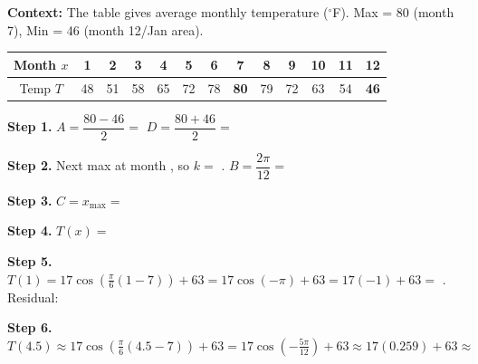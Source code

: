 \documentclass[10pt]{article}
\begin{document}
\begin{tcolorbox}[colback=white, colframe=black!40,
    title=\textbf{Tier R --- Reinforce (Key)},
    fonttitle=\bfseries, arc=2mm, left=3mm, right=3mm, top=2mm, bottom=2mm]

\textbf{Context:} The table gives average monthly temperature (${}^\circ$F).
Max = 80 (month 7), Min = 46 (month 12/Jan area).

\vspace{4pt}
\begin{center}
\renewcommand{\arraystretch}{1.35}
\small
\begin{tabular}{|c|c|c|c|c|c|c|c|c|c|c|c|c|}
\hline
Month $x$ & 1 & 2 & 3 & 4 & 5 & 6 & 7 & 8 & 9 & 10 & 11 & 12 \\
\hline
Temp $T$ & 48 & 51 & 58 & 65 & 72 & 78 & \textbf{80} & 79 & 72 & 63 & 54 & \textbf{46} \\
\hline
\end{tabular}
\end{center}

\vspace{4pt}
\textbf{Step 1.} $A = \dfrac{80-46}{2} = $  \qquad $D = \dfrac{80+46}{2} = $ 

\vspace{4pt}
\textbf{Step 2.} Next max at month , so $k = $ . $B = \dfrac{2\pi}{12} = $ 

\vspace{4pt}
\textbf{Step 3.} $C = x_{\max} = $ 

\vspace{4pt}
\textbf{Step 4.} $T(x) = $ 

\vspace{4pt}
\textbf{Step 5.} $T(1) = 17\cos\!\left(\tfrac{\pi}{6}(1-7)\right)+63 = 17\cos(-\pi)+63 = 17(-1)+63 = $ . Residual: 

\vspace{4pt}
\textbf{Step 6.} $T(4.5) \approx 17\cos\!\left(\tfrac{\pi}{6}(4.5-7)\right)+63 = 17\cos\!\left(-\tfrac{5\pi}{12}\right)+63 \approx 17(0.259)+63 \approx $ 

\end{tcolorbox}

\vspace{0.08in}
\end{document}
